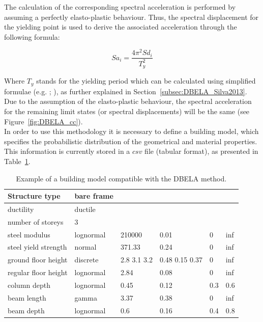 The calculation of the corresponding spectral acceleration is performed by assuming a perfectly elasto-plastic behaviour. Thus, the spectral displacement for the yielding point is used to derive the associated acceleration through the following formula:

\begin{equation}
Sa_i = \frac{4\pi^2Sd_i}{T_y^2}
\end{equation}

Where $T_y$ stands for the yielding period which can be calculated using simplified formulae (e.g. \cite{CrowleyPinho2004}; \cite{CrowleyPinho2006}), as further explained in Section~\ref{subsec:DBELA_Silva2013}. Due to the assumption of the elasto-plastic behaviour, the spectral acceleration for the remaining limit states (or spectral displacements) will be the same (see Figure~\ref{fig:DBELA_cc}).\\

In order to use this methodology it is necessary to define a building model, which specifies the probabilistic distribution of the geometrical and material properties. This information is currently stored in a $csv$ file (tabular format), as presented in Table~\ref{table:building_model_dbela}.

\begin {table}[htb]
\caption{Example of a building model compatible with the DBELA method.}
\label{table:building_model_dbela}
\begin{center}
  \begin{tabular}{ | l | l | l | l | l | l |}
  \hline
Structure type & bare frame &  &  &  &  \\ \hline
ductility & ductile &  &  &  &  \\ \hline
number of storeys & 3 &  &  &  &  \\ \hline
steel modulus & lognormal & 210000 & 0.01 & 0 & inf \\ \hline
steel yield strength & normal & 371.33 & 0.24 & 0 & inf \\ \hline
ground floor height & discrete & 2.8 3.1 3.2 & 0.48 0.15 0.37 & 0 & inf \\ \hline
regular floor height & lognormal & 2.84 & 0.08 & 0 & inf \\ \hline
column depth & lognormal & 0.45 & 0.12 & 0.3 & 0.6 \\ \hline
beam length & gamma & 3.37 & 0.38 & 0 & inf \\ \hline
beam depth & lognormal & 0.6 & 0.16 & 0.4 & 0.8 \\ \hline
  \end{tabular}
\end{center}
\end{table}

